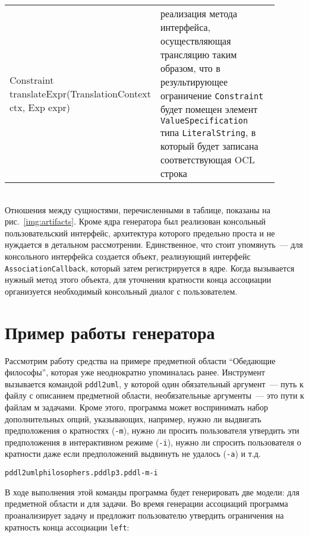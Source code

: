 {\begin{tabular}{R{0.45\linewidth}@{\quad-\quad}p{0.45\linewidth}}
        \hhline{==}
            \\
        \hline
            Constraint translateExpr(TranslationContext ctx, Exp expr) 
            & реализация метода интерфейса, осуществляющая трансляцию таким образом, что в результирующее ограничение \texttt{Constraint} будет помещен элемент \texttt{ValueSpecification} типа \texttt{LiteralString}, в который будет записана соответствующая OCL строка \\
    \end{tabular}
}
\\[5pt]

Отношения между сущностями, перечисленными в таблице, показаны на рис.~\ref{img:artifacts}.
Кроме ядра генератора был реализован консольный пользовательский интерфейс, архитектура которого предельно проста и не нуждается в детальном рассмотрении. Единственное, что стоит упомянуть~--- для консольного интерфейса создается объект, реализующий интерфейс \texttt{AssociationCallback}, который затем регистрируется в ядре. Когда вызывается нужный метод этого объекта, для уточнения кратности конца ассоциации организуется необходимый консольный диалог с пользователем.

\section{Пример работы генератора}

Рассмотрим работу средства на примере предметной области ``Обедающие философы'', которая уже неоднократно упоминалась ранее. Инструмент вызывается командой \texttt{pddl2uml}, у которой один обязательный аргумент~--- путь к файлу с описанием предметной области, необязательные аргументы~--- это пути к файлам м задачами. Кроме этого, программа может воспринимать набор дополнительных опций, указывающих, например, нужно ли выдвигать предположения о кратностях (\texttt{-m}), нужно ли просить пользователя утвердить эти предположения в интерактивном режиме (\texttt{-i}), нужно ли спросить пользователя о кратности даже если предположений выдвинуть не удалось (\texttt{-a}) и т.д.

\begin{alltt}\small
    pddl2uml philosophers.pddl p3.pddl -m -i
\end{alltt}

В ходе выполнения этой команды программа будет генерировать две модели: для предметной области и для задачи. Во время генерации ассоциаций программа проанализирует задачу и предложит пользователю утвердить ограничения на кратность конца ассоциации \texttt{left}:

